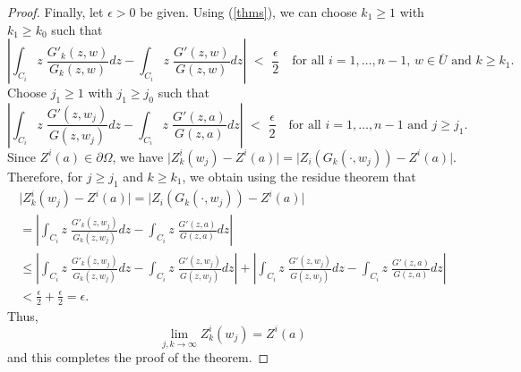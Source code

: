 \documentclass[10pt,a4paper]{amsart}
\begin{document}
\begin{proof}
		Finally, let $\epsilon>0$ be given. Using (\ref{thms}), we can choose $k_1\ge 1$ with $k_1\geq k_0$ such that
		\[
		\left\lvert
		\int_{C_i} z \; \frac{{G'_k}(z, w)}{G_k(z,w)} dz - \int_{C_i}  z \; \frac{G'(z, w)}{G(z,w)} dz 
		\right\rvert
		\,\,<\,\,
		\frac{\epsilon}{2}
		\quad
		\text{for all }i=1,\ldots, n-1,
		\,w\in\overline{U}
		\text{ and }
		k\geq k_1.
		\]
		Choose $j_1 \ge 1$ with $j_1\geq j_0$ such that
		\[
		\left\lvert
		\int_{C_i} z \; \frac{G'(z, w_j)}{G(z,w_j)} dz - \int_{C_i} z \; \frac{G'(z, a)}{G(z,a)} dz 
		\right\rvert 
		\,\,<\,\,
		\frac{\epsilon}{2}
		\quad
		\text{for all }i=1,\ldots, n-1
		\text{ and }
		j\geq j_1.
		\]
		Since $Z^i(a)\in\partial\Omega$, we have $\vert Z^i_k(w_j) - Z^i(a) \vert = \vert Z_i(G_k(\cdot,w_j)) - Z^i(a)\vert$. Therefore, for $j\geq j_1$ and $k\geq k_1$, we obtain using the residue theorem that
		\begin{multline*}
			\vert Z^i_k(w_j) - Z^i(a) \vert
			=
			\vert Z_i(G_k(\cdot,w_j)) - Z^i(a)\vert
			\\
			=
			\left\lvert
			\int_{C_i} z \; \frac{G'_k(z, w_j)}{G_k(z,w_j)} dz - \int_{C_i} z \; \frac{G'(z, a)}{G(z,a)} dz
			\right\rvert
			\\
			\leq
			\left\lvert
			\int_{C_i} z \; \frac{G'_k(z, w_j)}{G_k(z,w_j)} dz - \int_{C_i} z \;\frac{G'(z, w_j)}{G(z,w_j)} dz
			\right\rvert
			+
			\left\lvert
			\int_{C_i} z \;\frac{G'(z, w_j)}{G(z,w_j)} dz - \int_{C_i} z \; \frac{G'(z, a)}{G(z,a)} dz
			\right\rvert
			\\
			<
			\frac{\epsilon}{2} + \frac{\epsilon}{2} 
			= \epsilon.
		\end{multline*}
		Thus, 
		\begin{equation}
		\lim_{j,k\rightarrow\infty} Z^i_{k}(w_j) = Z^i(a)
		\end{equation}
		and this completes the proof of the theorem.		
	\end{proof}
\end{document}
